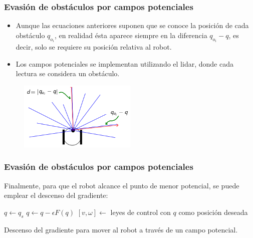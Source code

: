 \documentclass[10pt,spanish,aspectratio=1610]{beamer}
\begin{document}
\begin{frame}\frametitle{Evasión de obstáculos por campos potenciales}
  \begin{itemize}
  \item Aunque las ecuaciones anteriores suponen que se conoce la posición de cada obstáculo $q_{o_i}$, en realidad ésta aparece siempre en la diferencia $q_{o_i} - q$, es decir, solo se requiere su posición relativa al robot.
  \item Los campos potenciales se implementan utilizando el lidar, donde cada lectura se considera un obstáculo. 
  \end{itemize}
  \begin{figure}
    \centering
    \includegraphics[width=0.5\textwidth]{Figures/PotFieldsLidar.png}
  \end{figure}
\end{frame}

\begin{frame}\frametitle{Evasión de obstáculos por campos potenciales}
  Finalmente, para que el robot alcance el punto de menor potencial, se puede emplear el descenso del gradiente:
  \[\]
  \begin{algorithm}[H]
  \DontPrintSemicolon
  \;
$q \leftarrow q_s$\;
{
  $q \leftarrow q - \epsilon F(q)$\;
  $[v,\omega] \leftarrow $ leyes de control con $q$ como posición deseada\;
}
  \caption{Descenso del gradiente para mover al robot a través de un campo potencial.}
  \label{alg:PotFields}
\end{algorithm}
\end{frame}
\end{document}
